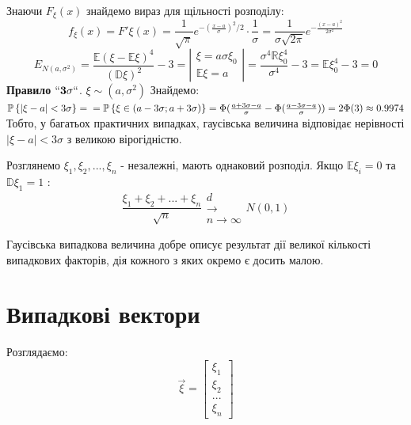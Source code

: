 \documentclass[fontsize=14pt,a4paper]{scrartcl}
\theoremstyle{definition}
\theoremstyle{remark}
\theoremstyle{definition}
\theoremstyle{definition}
\begin{document}
Знаючи $ F_ \xi (x) $  знайдемо вираз для щільності розподілу:
$$
f_ \xi (x ) = F' \xi (x) =  \frac{1}{\sqrt{\pi}} e^{ - (\frac{x-a}{\sigma})^2/2 } \cdot \frac{1}{\sigma}  =  \frac{1}{\sigma \sqrt{2\pi}} e^ { - \frac{(x-a)^2}{2 \sigma^2} }
$$
$$
E_{N(a, \sigma^2)} =  \frac{ \mathbb{E} \left( \xi - \mathbb{E} \xi \right)^4 }{ \left( \mathbb{D} \xi \right)^2 }  -3
 =\left|
\begin{gathered}
 \xi = a \sigma \xi_0 \\
 \mathbb{E} \xi = a
\end{gathered}
 \right|
 = \frac{ \sigma ^4 \mathbb{R} \xi_0^4 }{ \sigma^4} - 3 = \mathbb{E} \xi_0^4 - 3 = 0
$$
\textbf{Правило } $ \mathbf{``3 \sigma``}$. \quad $ \xi \sim (a, \sigma^2)$ \quad Знайдемо:
$\mathbb{P} \left\lbrace  \left| \xi - a \right | < 3 \sigma  \right\rbrace
 = \\ = \mathbb{P} \left\lbrace  \xi \in (a - 3 \sigma; a + 3\sigma) \right\rbrace
= \Phi ( \frac{a + 3\sigma  -a  }{\sigma}  - \Phi( \frac{a - 3\sigma - a}{\sigma} )) = 2\Phi (3) \approx 0.9974
$\\
Тобто, у багатьох практичних випадках, гаусівська величина відповідає нерівності $\left| \xi - a \right | < 3 \sigma$ з великою вірогідністю.\\


\begin{boxteo}
Розглянемо $\xi_1, \xi_2, ... , \xi_n$ - незалежні, мають однаковий розподіл.
Якщо $\mathbb{E} \xi_i = 0 $ та $\mathbb{D} \xi_1 = 1$ :
$$
\frac{\xi_1 + \xi_2 + ... + \xi_n}{\sqrt{n}} \begin{gathered}
 d\\ \longrightarrow \\
 n \to \infty
\end{gathered}  N (0,1)
$$
\end{boxteo}
Гаусівська випадкова величина добре описує результат дії великої кількості випадкових факторів, дія кожного з яких окремо є досить малою.

\section{Випадкові вектори}
Розглядаємо: $$ \vec{ \xi} = \begin{bmatrix}
 \xi_1 \\
 \xi_2\\
 ...\\
 \xi_n
\end{bmatrix}$$
\end{document}
